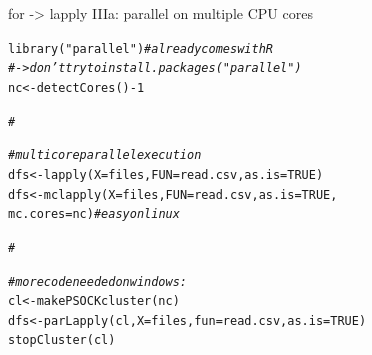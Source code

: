\documentclass[xcolor=table,           xcolor=dvipsnames]{beamer}\usepackage[]{graphicx}\usepackage[]{color}
\makeatletter
\newcommand{\hlnum}[1]{\textcolor[rgb]{0,0,0}{#1}}
\newcommand{\hlstr}[1]{\textcolor[rgb]{0.545,0.137,0.137}{#1}}
\newcommand{\hlcom}[1]{\textcolor[rgb]{0,0.392,0}{\textit{#1}}}
\newcommand{\hlopt}[1]{\textcolor[rgb]{0,0,0}{#1}}
\newcommand{\hlstd}[1]{\textcolor[rgb]{0,0,0}{#1}}
\newcommand{\hlkwb}[1]{\textcolor[rgb]{0,0,0}{#1}}
\newcommand{\hlkwc}[1]{\textcolor[rgb]{1,0,1}{#1}}
\newcommand{\hlkwd}[1]{\textcolor[rgb]{0,0,1}{#1}}
\newenvironment{kframe}{%
 \def\at@end@of@kframe{}%
 \ifinner\ifhmode%
  \def\at@end@of@kframe{\end{minipage}}%
  \begin{minipage}{\columnwidth}%
 \fi\fi%
 \def\FrameCommand##1{\hskip\@totalleftmargin \hskip-\fboxsep
 \colorbox{shadecolor}{##1}\hskip-\fboxsep
     \hskip-\linewidth \hskip-\@totalleftmargin \hskip\columnwidth}%
 \MakeFramed {\advance\hsize-\width
   \@totalleftmargin\z@ \linewidth\hsize
   \@setminipage}}%
 {\par\unskip\endMakeFramed%
 \at@end@of@kframe}
\newenvironment{knitrout}{}{} %
\makeatother
\begin{document}

\begin{frame}[fragile]{for -> lapply IIIa: parallel on multiple CPU cores}
\vspace{-1em}
\begin{knitrout}
\color{fgcolor}\begin{kframe}
\begin{alltt}
\hlkwd{library}\hlstd{(}\hlstr{"parallel"}\hlstd{)} \hlcom{# already comes with R }
\hlcom{# -> don't try to  install.packages("parallel")}
\hlstd{nc} \hlkwb{<-} \hlkwd{detectCores}\hlstd{()}\hlopt{-}\hlnum{1}

\hlcom{#}
\end{alltt}
\end{kframe}
\end{knitrout}
\pause \vspace{-2.6em}
\begin{knitrout}
\color{fgcolor}\begin{kframe}
\begin{alltt}
\hlcom{# multicore parallel execution}
\hlstd{dfs} \hlkwb{<-}        \hlkwd{lapply}\hlstd{(}\hlkwc{X}\hlstd{=files,} \hlkwc{FUN}\hlstd{=read.csv,} \hlkwc{as.is}\hlstd{=}\hlnum{TRUE}\hlstd{)}
\hlstd{dfs} \hlkwb{<-}      \hlkwd{mclapply}\hlstd{(}\hlkwc{X}\hlstd{=files,} \hlkwc{FUN}\hlstd{=read.csv,} \hlkwc{as.is}\hlstd{=}\hlnum{TRUE}\hlstd{,}
                     \hlkwc{mc.cores}\hlstd{=nc)} \hlcom{# easy on linux}

\hlcom{#}
\end{alltt}
\end{kframe}
\end{knitrout}
\pause \vspace{-2.6em}
\begin{knitrout}
\color{fgcolor}\begin{kframe}
\begin{alltt}
\hlcom{# more code needed on windows:}
\hlstd{cl} \hlkwb{<-} \hlkwd{makePSOCKcluster}\hlstd{(nc)}
\hlstd{dfs} \hlkwb{<-} \hlkwd{parLapply}\hlstd{(cl,} \hlkwc{X}\hlstd{=files,} \hlkwc{fun}\hlstd{=read.csv,} \hlkwc{as.is}\hlstd{=}\hlnum{TRUE}\hlstd{)}
\hlkwd{stopCluster}\hlstd{(cl)}


\end{alltt}
\end{kframe}
\end{knitrout}
\end{frame}
\end{document}
